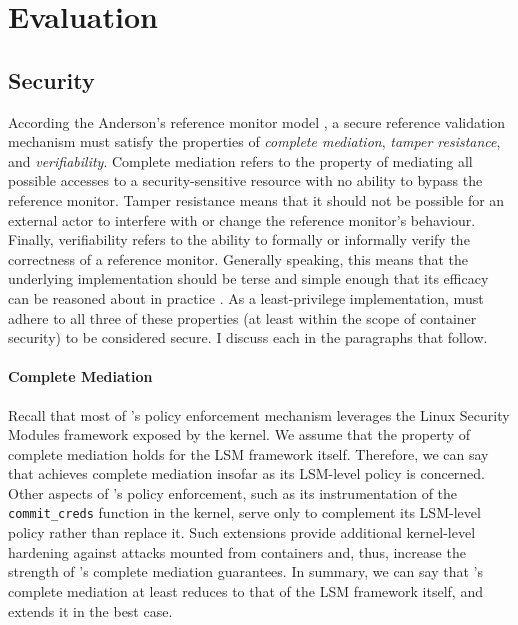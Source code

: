 \section{Evaluation}
\label{sec:eval}

\subsection{Security}

According the Anderson's reference monitor model \cite{anderson1973_planning_study}, a secure reference validation mechanism must satisfy the properties of \textit{complete mediation}, \textit{tamper resistance}, and \textit{verifiability}. Complete mediation refers to the property of mediating all possible accesses to a security-sensitive resource with no ability to bypass the reference monitor. Tamper resistance means that it should not be possible for an external actor to interfere with or change the reference monitor's behaviour. Finally, verifiability refers to the ability to formally or informally verify the correctness of a reference monitor. Generally speaking, this means that the underlying implementation should be terse and simple enough that its efficacy can be reasoned about in practice \cite{jaeger2011_reference_monitor}. As a least-privilege implementation, \bpfcontain{} must adhere to all three of these properties (at least within the scope of container security) to be considered secure. I discuss each in the paragraphs that follow.

\paragraph*{Complete Mediation}

Recall that most of \bpfcontain{}'s policy enforcement mechanism leverages the Linux Security Modules framework exposed by the kernel. We assume that the property of complete mediation holds for the LSM framework itself. Therefore, we can say that \bpfcontain{} achieves complete mediation insofar as its LSM-level policy is concerned. Other aspects of \bpfcontain{}'s policy enforcement, such as its instrumentation of the \texttt{commit\_creds} function in the kernel, serve only to complement its LSM-level policy rather than replace it. Such extensions provide additional kernel-level hardening against attacks mounted from containers and, thus, increase the strength of \bpfcontain{}'s complete mediation guarantees. In summary, we can say that \bpfcontain{}'s complete mediation at least reduces to that of the LSM framework itself, and extends it in the best case.

